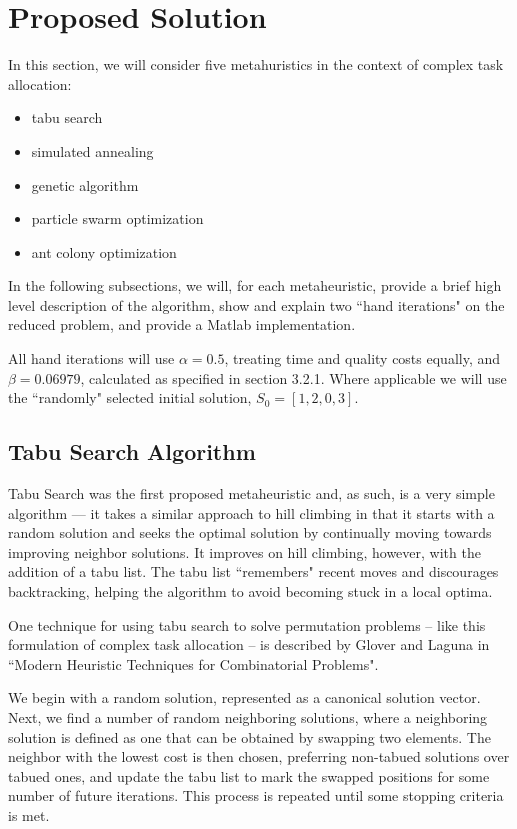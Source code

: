 \documentclass[a4paper]{article}
\begin{document}
\newpage
\section{Proposed Solution}

In this section, we will consider five metahuristics in the context of complex task allocation:
\begin{itemize}
\item tabu search
\item simulated annealing
\item genetic algorithm
\item particle swarm optimization
\item ant colony optimization
\end{itemize}

In the following subsections, we will, for each metaheuristic, provide a brief
high level description of the algorithm, show and explain two ``hand iterations"
on the reduced problem, and provide a Matlab implementation.

All hand iterations will use $\alpha = 0.5$, treating time and quality costs
equally, and $\beta = 0.06979$, calculated as specified in section 3.2.1. Where applicable
we will use the ``randomly" selected initial solution, $S_0 = [ 1, 2, 0, 3 ]$.

\subsection{Tabu Search Algorithm} %

Tabu Search was the first proposed metaheuristic\cite{GloverTabu} and, as such, is a very simple algorithm --- it takes a similar approach to  hill climbing in that it starts with a random solution and seeks the optimal solution by continually moving towards improving neighbor solutions. It improves on hill climbing, however, with the addition of a tabu list. The tabu list ``remembers" recent moves and discourages backtracking, helping the algorithm to avoid becoming stuck in a local optima.

One technique for using tabu search to solve permutation problems -- like this formulation of complex task allocation -- is described by Glover and Laguna in ``Modern Heuristic Techniques for Combinatorial Problems"\cite{GloverModern}.

We begin with a random solution, represented as a canonical solution vector. Next, we find a number of random neighboring solutions, where a neighboring solution is defined as one that can be obtained by swapping two elements. The neighbor with the lowest cost is then chosen, preferring non-tabued solutions over tabued ones, and update the tabu list to mark the swapped positions for some number of future iterations. This process is repeated until some stopping criteria is met.
\end{document}

